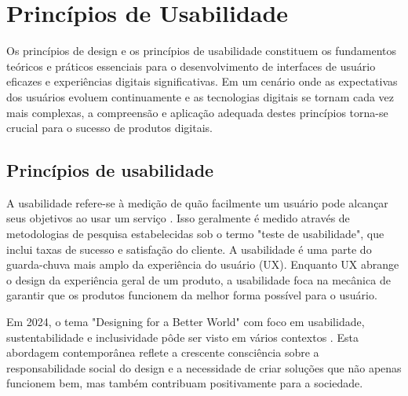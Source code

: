 \chapter{Princípios de Usabilidade}

Os princípios de design e os princípios de usabilidade constituem os fundamentos teóricos e práticos essenciais para o desenvolvimento de interfaces de usuário eficazes e experiências digitais significativas. Em um cenário onde as expectativas dos usuários evoluem continuamente e as tecnologias digitais se tornam cada vez mais complexas, a compreensão e aplicação adequada destes princípios torna-se crucial para o sucesso de produtos digitais.


\section{Princípios de usabilidade}

A usabilidade refere-se à medição de quão facilmente um usuário pode alcançar seus objetivos ao usar um serviço \cite{digital_gov_usability}. Isso geralmente é medido através de metodologias de pesquisa estabelecidas sob o termo "teste de usabilidade", que inclui taxas de sucesso e satisfação do cliente. A usabilidade é uma parte do guarda-chuva mais amplo da experiência do usuário (UX). Enquanto UX abrange o design da experiência geral de um produto, a usabilidade foca na mecânica de garantir que os produtos funcionem da melhor forma possível para o usuário.

Em 2024, o tema "Designing for a Better World" com foco em usabilidade, sustentabilidade e inclusividade pôde ser visto em vários contextos \cite{world_usability_day}. Esta abordagem contemporânea reflete a crescente consciência sobre a responsabilidade social do design e a necessidade de criar soluções que não apenas funcionem bem, mas também contribuam positivamente para a sociedade.

